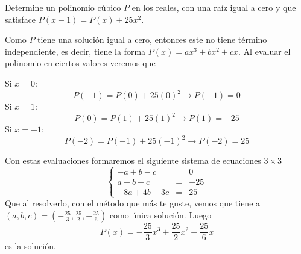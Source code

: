         \begin{section-problem}
            Determine un polinomio cúbico $P$ en los reales, con una raíz igual a cero y que satisface $P(x - 1) = P(x) + 25x^2$.

            \begin{solution}[1]
                Como $P$ tiene una solución igual a cero, entonces este no tiene término independiente, es decir, tiene la forma
                $P(x) = a x^3 + b x^2 + c x$.
                Al evaluar el polinomio en ciertos valores veremos que

                Si $x = 0$: \[P(-1) = P(0) + 25(0)^2 \longrightarrow \boxed{P(-1) = 0}\]
                Si $x = 1$: \[P(0) = P(1) + 25(1)^2 \longrightarrow \boxed{P(1) = -25}\]
                Si $x = -1$: \[P(-2) = P(-1) + 25(-1)^2 \longrightarrow \boxed{P(-2) = 25}\]

                Con estas evaluaciones formaremos el siguiente sistema de ecuaciones $3 \times 3$
                \[
                    \left\{
                    \begin{array}{rcl}
                        - a +  b -  c & = & 0 \\
                        a +  b +  c & = & -25 \\
                        - 8a + 4b - 3c & = & 25
                    \end{array}
                    \right.
                \]
                Que al resolverlo, con el método que más te guste, vemos que tiene a $(a, b, c) = \left(-\frac{25}{3}, \frac{25}{2}, -\frac{25}{6} \right)$
                como única solución. Luego
                \[\boxed{ P(x) = -\frac{25}{3}x^3 + \frac{25}{2} x^2 - \frac{25}{6} x }\]
                es la solución.
            \end{solution}


\end{section-problem}
